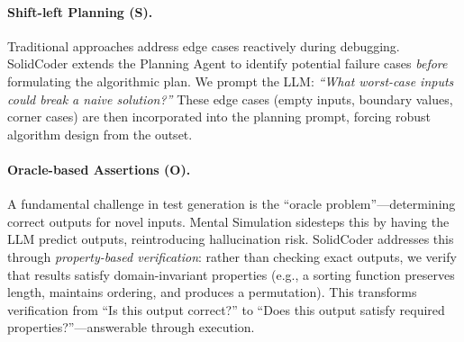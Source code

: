 \documentclass[11pt]{article}
\begin{document}
\paragraph{Shift-left Planning (S).} Traditional approaches address edge cases reactively during debugging. SolidCoder extends the Planning Agent to identify potential failure cases \textit{before} formulating the algorithmic plan. We prompt the LLM: \textit{``What worst-case inputs could break a naive solution?''} These edge cases (empty inputs, boundary values, corner cases) are then incorporated into the planning prompt, forcing robust algorithm design from the outset.

\paragraph{Oracle-based Assertions (O).} A fundamental challenge in test generation is the ``oracle problem''---determining correct outputs for novel inputs. Mental Simulation sidesteps this by having the LLM predict outputs, reintroducing hallucination risk. SolidCoder addresses this through \textit{property-based verification}: rather than checking exact outputs, we verify that results satisfy domain-invariant properties (e.g., a sorting function preserves length, maintains ordering, and produces a permutation). This transforms verification from ``Is this output correct?'' to ``Does this output satisfy required properties?''---answerable through execution.

\end{document}
